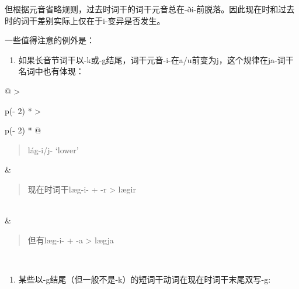 但根据元音省略规则，过去时词干的词干元音总在-ði-前脱落。因此现在时和过去时的词干差别实际上仅在于i-变异是否发生。

一些值得注意的例外是：

\begin{enumerate}
  \def\labelenumi{\arabic{enumi})}
  \item
        如果长音节词干以-k或-g结尾，词干元音-i-在a/u前变为j，这个规律在ja-词干名词中也有体现：
\end{enumerate}

\begin{longtable}[]{@{}
  >{\raggedright\arraybackslash}p{(\columnwidth - 2\tabcolsep) * }
  >{\raggedright\arraybackslash}p{(\columnwidth - 2\tabcolsep) * }@{}}
  \toprule\noalign{}
  \begin{minipage}[b]{\linewidth}\raggedright
    \begin{quote}
      lág-i/j- `lower‌'
    \end{quote}
  \end{minipage} & \begin{minipage}[b]{\linewidth}\raggedright
                     \begin{quote}
      现在时词干læg-i- + -r \textgreater{} lægir
    \end{quote}
                   \end{minipage}                              \\
  \midrule\noalign{}
  \endhead
  \bottomrule\noalign{}
  \endlastfoot
                                              & \begin{minipage}[t]{\linewidth}\raggedright
                                                  \begin{quote}
      但有læg-i- + -a \textgreater{} lægja
    \end{quote}
                                                \end{minipage} \\
\end{longtable}

\begin{enumerate}
  \def\labelenumi{\arabic{enumi})}
  \setcounter{enumi}{1}
  \item
        某些以-g结尾（但一般不是-k）的短词干动词在现在时词干末尾双写-g:
\end{enumerate}

